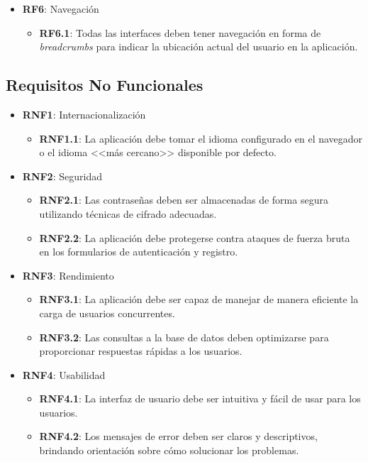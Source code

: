 \begin{itemize}
  \item \textbf{RF6}: Navegación
  \begin{itemize}
    \item \textbf{RF6.1}: Todas las interfaces deben tener navegación en forma de \textit{breadcrumbs} para indicar la ubicación actual del usuario en la aplicación.
  \end{itemize}
  
\end{itemize}

\subsection{Requisitos No Funcionales}

\begin{itemize}
  \item \textbf{RNF1}: Internacionalización
  \begin{itemize}
    \item \textbf{RNF1.1}: La aplicación debe tomar el idioma configurado en el navegador o el idioma <<más cercano>> disponible por defecto.
  \end{itemize}
  
  \item \textbf{RNF2}: Seguridad
  \begin{itemize}
    \item \textbf{RNF2.1}: Las contraseñas deben ser almacenadas de forma segura utilizando técnicas de cifrado adecuadas.
    \item \textbf{RNF2.2}: La aplicación debe protegerse contra ataques de fuerza bruta en los formularios de autenticación y registro.
  \end{itemize}
  
  \item \textbf{RNF3}: Rendimiento
  \begin{itemize}
    \item \textbf{RNF3.1}: La aplicación debe ser capaz de manejar de manera eficiente la carga de usuarios concurrentes.
    \item \textbf{RNF3.2}: Las consultas a la base de datos deben optimizarse para proporcionar respuestas rápidas a los usuarios.
  \end{itemize}
  
  \item \textbf{RNF4}: Usabilidad
  \begin{itemize}
    \item \textbf{RNF4.1}: La interfaz de usuario debe ser intuitiva y fácil de usar para los usuarios.
    \item \textbf{RNF4.2}: Los mensajes de error deben ser claros y descriptivos, brindando orientación sobre cómo solucionar los problemas.
  \end{itemize}
  

\end{itemize}
